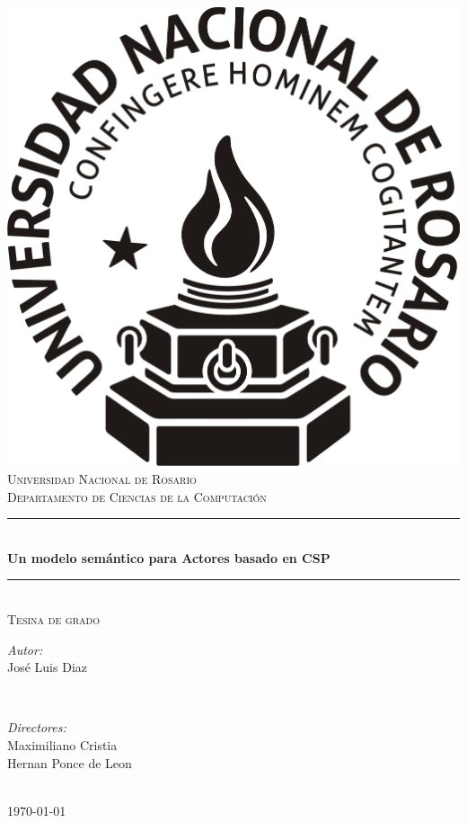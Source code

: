 \begin{titlepage}
\centering
\vspace*{0.5 cm}
        \includegraphics[width=3.0 cm]{img/logo.png}\\[1.0 cm]
        \textsc{\LARGE Universidad Nacional de Rosario}\\[0.5 cm]
	\textsc{\large Departamento de Ciencias de la Computaci\'{o}n}\\[2.5 cm]

	\rule{\linewidth}{0.3 mm} \\[0.4 cm]
	{ \huge \bfseries Un modelo semántico para Actores basado en CSP }\\
	\rule{\linewidth}{0.3 mm} \\[0.5 cm]
	\textsc{\Large Tesina de grado}\\[2.5 cm]
	
	\begin{minipage}{0.4\textwidth}
	\begin{flushleft} \large
	  \emph{Autor:}\\
	  José Luis Diaz  \\
	\end{flushleft}
	\end{minipage}~
	\begin{minipage}{0.4\textwidth}
        \begin{flushright} \large
	  \emph{Directores:} \\
	  Maximiliano Cristia \\
	  Hernan Ponce de Leon \\
	\end{flushright}        
	\end{minipage}\\[1.5 cm]
        \today

\end{titlepage}